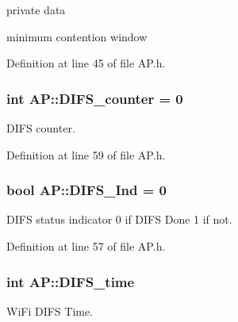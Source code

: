 private data 

minimum contention window 

Definition at line 45 of file A\-P.\-h.

\hypertarget{classAP_ae8b5098c1fed76aeecdb1ed35f8952a1}{
\subsubsection[{D\-I\-F\-S\-\_\-counter}]{\setlength{\rightskip}{0pt plus 5cm}int A\-P\-::\-D\-I\-F\-S\-\_\-counter = 0\hspace{0.3cm}{\ttfamily [private]}}}\label{classAP_ae8b5098c1fed76aeecdb1ed35f8952a1}


D\-I\-F\-S counter. 



Definition at line 59 of file A\-P.\-h.

\hypertarget{classAP_ae9749297d96e52a95a4f52f795127f8e}{
\subsubsection[{D\-I\-F\-S\-\_\-\-Ind}]{\setlength{\rightskip}{0pt plus 5cm}bool A\-P\-::\-D\-I\-F\-S\-\_\-\-Ind = 0\hspace{0.3cm}{\ttfamily [private]}}}\label{classAP_ae9749297d96e52a95a4f52f795127f8e}


D\-I\-F\-S status indicator 0 if D\-I\-F\-S Done 1 if not. 



Definition at line 57 of file A\-P.\-h.

\hypertarget{classAP_a41453568719c530c6a7376273c02a6fa}{
\subsubsection[{D\-I\-F\-S\-\_\-time}]{\setlength{\rightskip}{0pt plus 5cm}int A\-P\-::\-D\-I\-F\-S\-\_\-time\hspace{0.3cm}{\ttfamily [private]}}}\label{classAP_a41453568719c530c6a7376273c02a6fa}


Wi\-Fi D\-I\-F\-S Time. 



